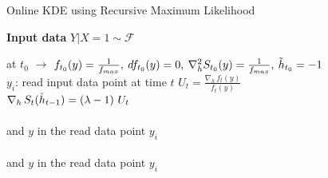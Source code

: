 \begin{algorithm}[]
\caption{Online KDE using Recursive Maximum Likelihood}
\begin{spacing}{1.7}
\hspace*{\algorithmicindent} \textbf{Input data} $Y|X=1 \sim \mathcal{F}$ 
\begin{algorithmic}[1] \label{alg:RML_algorithm}
\STATE at $t_{0}$ $\rightarrow$ \: $f_{t_{0}}(y) = \frac{1}{f_{max}}, \: df_{t_{0}}(y) = 0, \: \nabla^2_h \mathlarger{S}_{t_{0}}(y) = \frac{1}{f_{max}},\: \tilde{h}_{t_{0}} = -1$ \\ %
     \STATE $y_i$: read input data point at time $t$ 
     \STATE $U_t = \frac{\nabla_h \, f_t (y)}{f_t (y)}$\\ %
     \STATE $\nabla_h \, \mathlarger{S}_t (\hat{h}_{t-1}) =  (\lambda - 1) \ \mathlarger{U}_t$ \\ %
     \STATE {} \\ \hspace{75pt} and $y$ in the read data point $y_i$\\
     \STATE {} \\ \hspace{75pt} and $y$ in the read data point $y_i$\\

\end{algorithmic}
\end{spacing}
\end{algorithm}
